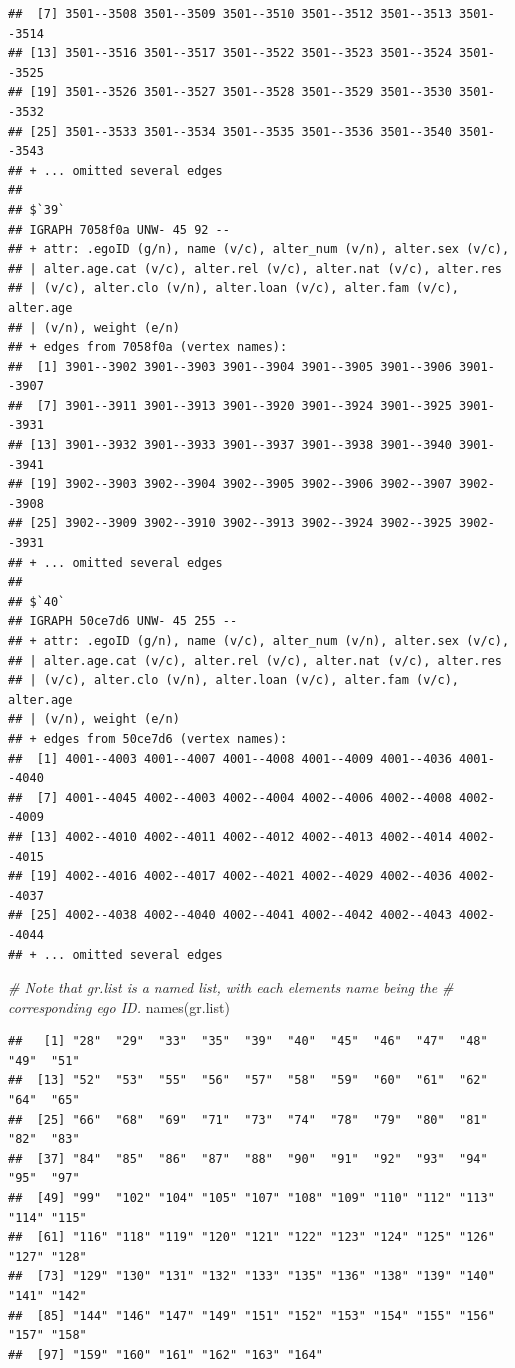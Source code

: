 \documentclass[
]{book}
\newenvironment{Shaded}{\begin{snugshade}}{\end{snugshade}}
\newcommand{\CommentTok}[1]{\textcolor[rgb]{0.56,0.35,0.01}{\textit{#1}}}
\newcommand{\FunctionTok}[1]{\textcolor[rgb]{0.00,0.00,0.00}{#1}}
\newcommand{\NormalTok}[1]{#1}
\begin{document}
\begin{verbatim}
##  [7] 3501--3508 3501--3509 3501--3510 3501--3512 3501--3513 3501--3514
## [13] 3501--3516 3501--3517 3501--3522 3501--3523 3501--3524 3501--3525
## [19] 3501--3526 3501--3527 3501--3528 3501--3529 3501--3530 3501--3532
## [25] 3501--3533 3501--3534 3501--3535 3501--3536 3501--3540 3501--3543
## + ... omitted several edges
## 
## $`39`
## IGRAPH 7058f0a UNW- 45 92 -- 
## + attr: .egoID (g/n), name (v/c), alter_num (v/n), alter.sex (v/c),
## | alter.age.cat (v/c), alter.rel (v/c), alter.nat (v/c), alter.res
## | (v/c), alter.clo (v/n), alter.loan (v/c), alter.fam (v/c), alter.age
## | (v/n), weight (e/n)
## + edges from 7058f0a (vertex names):
##  [1] 3901--3902 3901--3903 3901--3904 3901--3905 3901--3906 3901--3907
##  [7] 3901--3911 3901--3913 3901--3920 3901--3924 3901--3925 3901--3931
## [13] 3901--3932 3901--3933 3901--3937 3901--3938 3901--3940 3901--3941
## [19] 3902--3903 3902--3904 3902--3905 3902--3906 3902--3907 3902--3908
## [25] 3902--3909 3902--3910 3902--3913 3902--3924 3902--3925 3902--3931
## + ... omitted several edges
## 
## $`40`
## IGRAPH 50ce7d6 UNW- 45 255 -- 
## + attr: .egoID (g/n), name (v/c), alter_num (v/n), alter.sex (v/c),
## | alter.age.cat (v/c), alter.rel (v/c), alter.nat (v/c), alter.res
## | (v/c), alter.clo (v/n), alter.loan (v/c), alter.fam (v/c), alter.age
## | (v/n), weight (e/n)
## + edges from 50ce7d6 (vertex names):
##  [1] 4001--4003 4001--4007 4001--4008 4001--4009 4001--4036 4001--4040
##  [7] 4001--4045 4002--4003 4002--4004 4002--4006 4002--4008 4002--4009
## [13] 4002--4010 4002--4011 4002--4012 4002--4013 4002--4014 4002--4015
## [19] 4002--4016 4002--4017 4002--4021 4002--4029 4002--4036 4002--4037
## [25] 4002--4038 4002--4040 4002--4041 4002--4042 4002--4043 4002--4044
## + ... omitted several edges
\end{verbatim}

\begin{Shaded}
\begin{Highlighting}[]
\CommentTok{\# Note that gr.list is a named list, with each element\textquotesingle{}s name being the }
\CommentTok{\# corresponding ego ID.}
\FunctionTok{names}\NormalTok{(gr.list)}
\end{Highlighting}
\end{Shaded}

\begin{verbatim}
##   [1] "28"  "29"  "33"  "35"  "39"  "40"  "45"  "46"  "47"  "48"  "49"  "51" 
##  [13] "52"  "53"  "55"  "56"  "57"  "58"  "59"  "60"  "61"  "62"  "64"  "65" 
##  [25] "66"  "68"  "69"  "71"  "73"  "74"  "78"  "79"  "80"  "81"  "82"  "83" 
##  [37] "84"  "85"  "86"  "87"  "88"  "90"  "91"  "92"  "93"  "94"  "95"  "97" 
##  [49] "99"  "102" "104" "105" "107" "108" "109" "110" "112" "113" "114" "115"
##  [61] "116" "118" "119" "120" "121" "122" "123" "124" "125" "126" "127" "128"
##  [73] "129" "130" "131" "132" "133" "135" "136" "138" "139" "140" "141" "142"
##  [85] "144" "146" "147" "149" "151" "152" "153" "154" "155" "156" "157" "158"
##  [97] "159" "160" "161" "162" "163" "164"
\end{verbatim}
\end{document}
